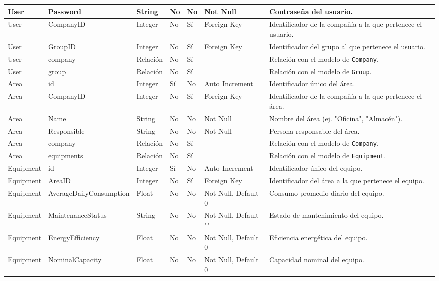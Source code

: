 \documentclass[12pt]{article}
\begin{document}
\begin{longtable}{|l|l|l|l|l|l|l|}
    \hline
    User & Password & String & No & No & Not Null & Contraseña del usuario. \\
    \hline
    User & CompanyID & Integer & No & Sí & Foreign Key & Identificador de la compañía a la que pertenece el usuario. \\
    \hline
    User & GroupID & Integer & No & Sí & Foreign Key & Identificador del grupo al que pertenece el usuario. \\
    \hline
    User & company & Relación & No & Sí & & Relación con el modelo de \texttt{Company}. \\
    \hline
    User & group & Relación & No & Sí & & Relación con el modelo de \texttt{Group}. \\
    \hline
    Area & id & Integer & Sí & No & Auto Increment & Identificador único del área. \\
    \hline
    Area & CompanyID & Integer & No & Sí & Foreign Key & Identificador de la compañía a la que pertenece el área. \\
    \hline
    Area & Name & String & No & No & Not Null & Nombre del área (ej. "Oficina", "Almacén"). \\
    \hline
    Area & Responsible & String & No & No & Not Null & Persona responsable del área. \\
    \hline
    Area & company & Relación & No & Sí & & Relación con el modelo de \texttt{Company}. \\
    \hline
    Area & equipments & Relación & No & Sí & & Relación con el modelo de \texttt{Equipment}. \\
    \hline
    Equipment & id & Integer & Sí & No & Auto Increment & Identificador único del equipo. \\
    \hline
    Equipment & AreaID & Integer & No & Sí & Foreign Key & Identificador del área a la que pertenece el equipo. \\
    \hline
    Equipment & AverageDailyConsumption & Float & No & No & Not Null, Default 0 & Consumo promedio diario del equipo. \\
    \hline
    Equipment & MaintenanceStatus & String & No & No & Not Null, Default "" & Estado de mantenimiento del equipo. \\
    \hline
    Equipment & EnergyEfficiency & Float & No & No & Not Null, Default 0 & Eficiencia energética del equipo. \\
    \hline
    Equipment & NominalCapacity & Float & No & No & Not Null, Default 0 & Capacidad nominal del equipo. \\
    \hline

\end{longtable}
\end{document}
